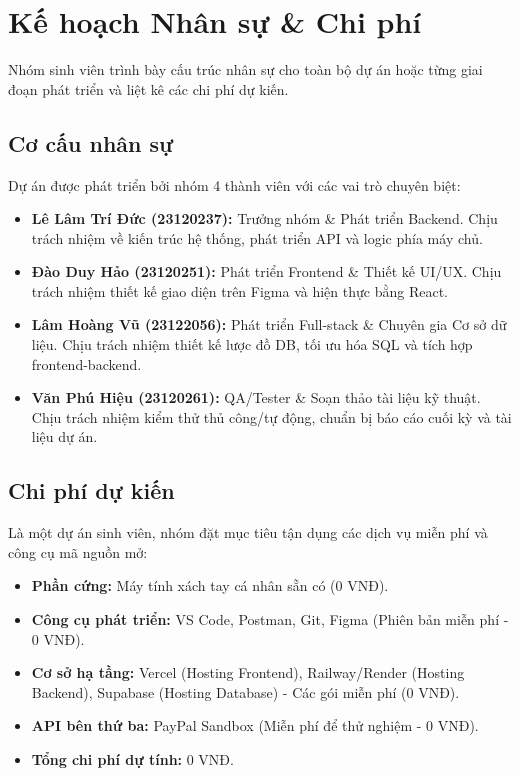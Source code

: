 \section{Kế hoạch Nhân sự \& Chi phí}

Nhóm sinh viên trình bày cấu trúc nhân sự cho toàn bộ dự án hoặc từng giai đoạn phát triển và liệt kê các chi phí dự kiến.

\subsection{Cơ cấu nhân sự}
Dự án được phát triển bởi nhóm 4 thành viên với các vai trò chuyên biệt:

\begin{itemize}
    \item \textbf{Lê Lâm Trí Đức (23120237):} Trưởng nhóm \& Phát triển Backend. Chịu trách nhiệm về kiến trúc hệ thống, phát triển API và logic phía máy chủ.
    \item \textbf{Đào Duy Hảo (23120251):} Phát triển Frontend \& Thiết kế UI/UX. Chịu trách nhiệm thiết kế giao diện trên Figma và hiện thực bằng React.
    \item \textbf{Lâm Hoàng Vũ (23122056):} Phát triển Full-stack \& Chuyên gia Cơ sở dữ liệu. Chịu trách nhiệm thiết kế lược đồ DB, tối ưu hóa SQL và tích hợp frontend-backend.
    \item \textbf{Văn Phú Hiệu (23120261):} QA/Tester \& Soạn thảo tài liệu kỹ thuật. Chịu trách nhiệm kiểm thử thủ công/tự động, chuẩn bị báo cáo cuối kỳ và tài liệu dự án.
\end{itemize}

\subsection{Chi phí dự kiến}
Là một dự án sinh viên, nhóm đặt mục tiêu tận dụng các dịch vụ miễn phí và công cụ mã nguồn mở:

\begin{itemize}
    \item \textbf{Phần cứng:} Máy tính xách tay cá nhân sẵn có (0 VNĐ).
    \item \textbf{Công cụ phát triển:} VS Code, Postman, Git, Figma (Phiên bản miễn phí - 0 VNĐ).
    \item \textbf{Cơ sở hạ tầng:} Vercel (Hosting Frontend), Railway/Render (Hosting Backend), Supabase (Hosting Database) - Các gói miễn phí (0 VNĐ).
    \item \textbf{API bên thứ ba:} PayPal Sandbox (Miễn phí để thử nghiệm - 0 VNĐ).
    \item \textbf{Tổng chi phí dự tính:} 0 VNĐ.
\end{itemize}
